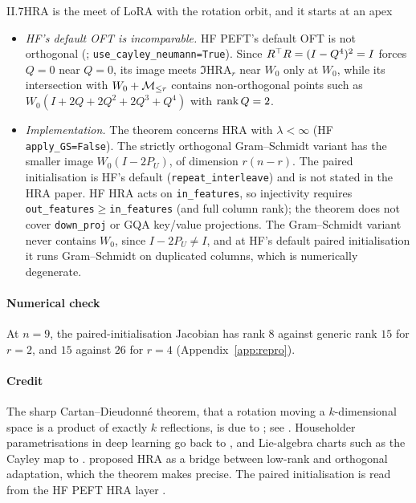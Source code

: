 \begin{theorem}{II.7}{HRA is the meet of LoRA with the rotation orbit, and it starts at an apex}
\begin{enumerate}[label=(\alph*)]
\begin{itemize}
        For exact full-block Cayley OFT (the original paper; HF with \texttt{use\_cayley\_\allowbreak neumann=False}),
        $(W_0+\Mr)\cap\Im\mathrm{OFT}$ is dense in $\Im\mathrm{HRA}_r$ but not equal to it: $W_0H_{e_1}H_{e_2}$, with
        $H_{e_1}H_{e_2}=\diag(-1,-1,1,\dots,1)$, is missing. For exact block Cayley OFT with $b<n$ the intersection is a
        proper subset of $\Im\mathrm{HRA}_r$.
      \item \emph{HF's default OFT is incomparable.} HF PEFT's default OFT is not orthogonal (;
        \texttt{use\_cayley\_\allowbreak neumann=True}). Since $R^{\top} R=(I-Q^4)^2=I$ forces $Q=0$ near $Q=0$, its image meets
        $\Im\mathrm{HRA}_r$ near $W_0$ only at $W_0$, while its intersection with $W_0+\mathcal{M}_{\le r}$ contains non-orthogonal
        points such as $W_0(I+2Q+2Q^2+2Q^3+Q^4)$ with $\operatorname{rank} Q=2$.
      \item \emph{Implementation.} The theorem concerns HRA with $\lambda<\infty$ (HF \texttt{apply\_GS=False}). The
        strictly orthogonal Gram--Schmidt variant has the smaller image $W_0(I-2P_U)$, of dimension $r(n-r)$. The
        paired initialisation is HF's default (\texttt{repeat\_interleave}) and is not stated in the HRA paper. HF HRA
        acts on \texttt{in\_features}, so injectivity requires \texttt{out\_features}${}\ge{}$\texttt{in\_features}
        (and full column rank); the theorem does not cover \texttt{down\_proj} or GQA key/value projections. The
        Gram--Schmidt variant never contains $W_0$, since $I-2P_U\ne I$, and at HF's default paired initialisation it
        runs Gram--Schmidt on duplicated columns, which is numerically degenerate.
    \end{itemize}
\end{enumerate}
\end{theorem}

\paragraph{Numerical check}
At $n=9$, the paired-initialisation Jacobian has rank $8$ against generic rank $15$ for $r=2$, and $15$ against $26$
for $r=4$ (Appendix~\ref{app:repro}).

\paragraph{Credit}
The sharp Cartan--Dieudonn\'e theorem, that a rotation moving a $k$-dimensional space is a product of exactly $k$
reflections, is due to \citet{xscherk1950decomposition}; see \citet{xartin1957geometric}. Householder parametrisations
in deep learning go back to \citet{mhammedi2016efficient}, and Lie-algebra charts such as the Cayley map to
\citet{lezcanocasado2019cheap}. \citet{yuan2024bridging} proposed HRA as a bridge between low-rank and orthogonal
adaptation, which the theorem makes precise. The paired initialisation is read from the HF PEFT HRA layer
\citep{xmangrulkar2022peft}.

